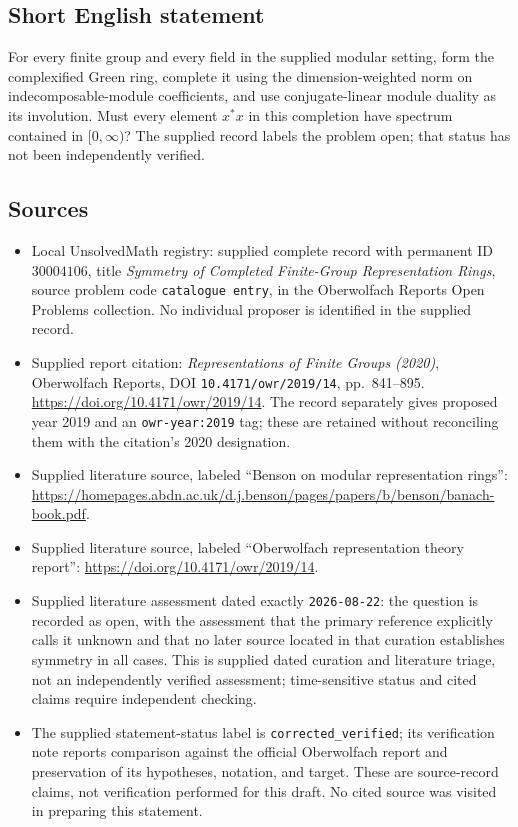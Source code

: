 \documentclass[11pt]{article}
\begin{document}
\subsection{Short English statement}
For every finite group and every field in the supplied modular setting, form the complexified Green ring, complete it using the dimension-weighted norm on indecomposable-module coefficients, and use conjugate-linear module duality as its involution. Must every element \(x^*x\) in this completion have spectrum contained in \([0,\infty)\)? The supplied record labels the problem open; that status has not been independently verified.
\subsection{Sources}
\begin{itemize}
\item Local UnsolvedMath registry: supplied complete record with permanent ID \(30004106\), title \emph{Symmetry of Completed Finite-Group Representation Rings}, source problem code \texttt{catalogue entry}, in the Oberwolfach Reports Open Problems collection. No individual proposer is identified in the supplied record.
\item Supplied report citation: \emph{Representations of Finite Groups (2020)}, Oberwolfach Reports, DOI \texttt{10.4171/owr/2019/14}, pp.\ 841--895. \url{https://doi.org/10.4171/owr/2019/14}. The record separately gives proposed year 2019 and an \texttt{owr-year:2019} tag; these are retained without reconciling them with the citation's 2020 designation.
\item Supplied literature source, labeled ``Benson on modular representation rings'': \url{https://homepages.abdn.ac.uk/d.j.benson/pages/papers/b/benson/banach-book.pdf}.
\item Supplied literature source, labeled ``Oberwolfach representation theory report'': \url{https://doi.org/10.4171/owr/2019/14}.
\item Supplied literature assessment dated exactly \texttt{2026-08-22}: the question is recorded as open, with the assessment that the primary reference explicitly calls it unknown and that no later source located in that curation establishes symmetry in all cases. This is supplied dated curation and literature triage, not an independently verified assessment; time-sensitive status and cited claims require independent checking.
\item The supplied statement-status label is \texttt{corrected\_verified}; its verification note reports comparison against the official Oberwolfach report and preservation of its hypotheses, notation, and target. These are source-record claims, not verification performed for this draft. No cited source was visited in preparing this statement.
\end{itemize}
\end{document}
